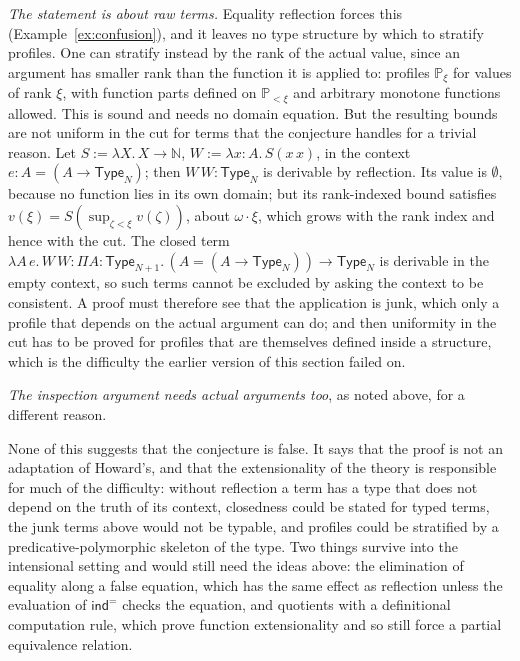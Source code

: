 \documentclass[10pt]{article}
\newcommand{\N}{\mathbb{N}}
\newcommand{\Type}{\mathsf{Type}}
\begin{document}
\emph{The statement is about raw terms.} Equality reflection forces
this (Example~\ref{ex:confusion}), and it leaves no type structure by
which to stratify profiles. One can stratify instead by the rank of the
actual value, since an argument has smaller rank than the function it
is applied to: profiles $\mathbb P_\xi$ for values of rank $\xi$, with
function parts defined on $\mathbb P_{<\xi}$ and arbitrary monotone
functions allowed. This is sound and needs no domain equation. But the
resulting bounds are not uniform in the cut for terms that the
conjecture handles for a trivial reason. Let $S:=\lambda X.\,X\to\N$,
$W:=\lambda x{:}A.\,S(x\,x)$, in the context
$e:A=(A\to\Type_N)$; then $W\,W:\Type_N$ is derivable by reflection. Its
value is $\emptyset$, because no function lies in its own domain; but
its rank-indexed bound satisfies $v(\xi)=S(\sup_{\zeta<\xi}v(\zeta))$,
about $\omega\cdot\xi$, which grows with the rank index and hence with
the cut. The closed term
$\lambda A\,e.\,W\,W:\Pi A{:}\Type_{N+1}.\,(A=(A\to\Type_N))\to\Type_N$
is derivable in the empty context, so such terms cannot be excluded by
asking the context to be consistent. A proof must therefore see that
the application is junk, which only a profile that depends on the
actual argument can do; and then uniformity in the cut has to be proved
for profiles that are themselves defined inside a structure, which is
the difficulty the earlier version of this section failed on.

\emph{The inspection argument needs actual arguments too}, as noted
above, for a different reason.

None of this suggests that the conjecture is false. It says that the
proof is not an adaptation of Howard's, and that the extensionality of
the theory is responsible for much of the difficulty: without
reflection a term has a type that does not depend on the truth of its
context, closedness could be stated for typed terms, the junk terms
above would not be typable, and profiles could be stratified by a
predicative-polymorphic skeleton of the type. Two things survive into
the intensional setting and would still need the ideas above: the
elimination of equality along a false equation, which has the same
effect as reflection unless the evaluation of $\mathsf{ind}^=$ checks the
equation, and quotients with a definitional computation rule, which
prove function extensionality and so still force a partial equivalence
relation.
\end{document}
